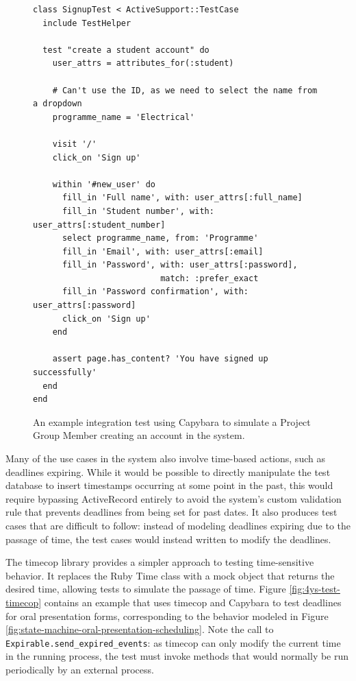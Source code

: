 \documentclass[document.tex]{subfiles}
\begin{document}

\begin{figure}[!ht]
  \begin{lstlisting}
class SignupTest < ActiveSupport::TestCase
  include TestHelper

  test "create a student account" do
    user_attrs = attributes_for(:student)

    # Can't use the ID, as we need to select the name from a dropdown
    programme_name = 'Electrical'

    visit '/'
    click_on 'Sign up'

    within '#new_user' do
      fill_in 'Full name', with: user_attrs[:full_name]
      fill_in 'Student number', with: user_attrs[:student_number]
      select programme_name, from: 'Programme'
      fill_in 'Email', with: user_attrs[:email]
      fill_in 'Password', with: user_attrs[:password],
                          match: :prefer_exact
      fill_in 'Password confirmation', with: user_attrs[:password]
      click_on 'Sign up'
    end

    assert page.has_content? 'You have signed up successfully'
  end
end
  \end{lstlisting}
  \cprotect \caption{An example integration test using Capybara to simulate a Project Group Member creating an account in the system.}
  \label{fig:4ys-test-signup}
\end{figure}


Many of the use cases in the system also involve time-based actions, such as deadlines expiring. While it would be possible to directly manipulate the test database to insert timestamps occurring at some point in the past, this would require bypassing ActiveRecord entirely to avoid the system's custom validation rule that prevents deadlines from being set for past dates. It also produces test cases that are difficult to follow: instead of modeling deadlines expiring due to the passage of time, the test cases would instead written to modify the deadlines.

The timecop library provides a simpler approach to testing time-sensitive behavior. It replaces the Ruby Time class with a mock object that returns the desired time, allowing tests to simulate the passage of time. Figure \ref{fig:4ys-test-timecop} contains an example that uses timecop and Capybara to test deadlines for oral presentation forms, corresponding to the behavior modeled in Figure \ref{fig:state-machine-oral-presentation-scheduling}. Note the call to \verb!Expirable.send_expired_events!: as timecop can only modify the current time in the running process, the test must invoke methods that would normally be run periodically by an external process.
\end{document}
